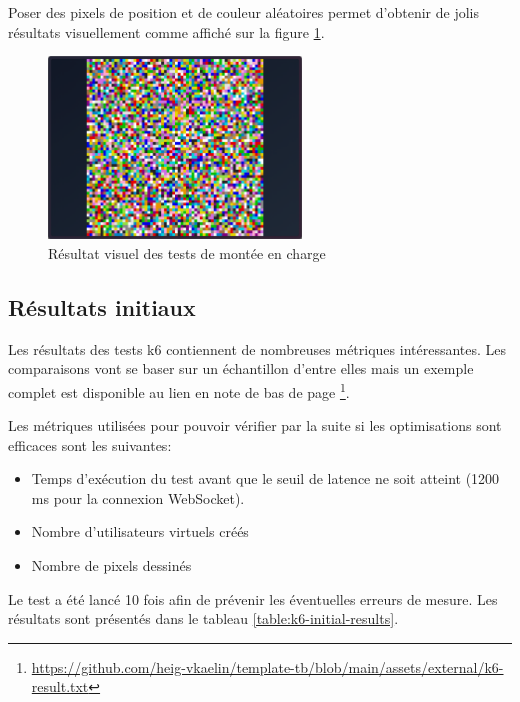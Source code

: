 Poser des pixels de position et de couleur aléatoires permet d'obtenir de jolis résultats visuellement comme affiché sur la figure \ref{fig:load-test-result}.

\begin{figure}[H]
  \centering
  \includegraphics[width=0.6\textwidth]{assets/figures/load-test-result.png}
  \caption{Résultat visuel des tests de montée en charge}
  \label{fig:load-test-result}
\end{figure}

\subsection{Résultats initiaux}

Les résultats des tests k6 contiennent de nombreuses métriques intéressantes. Les comparaisons vont se baser sur un échantillon d'entre elles mais un exemple complet est disponible au lien en note de bas de page \footnote{\url{https://github.com/heig-vkaelin/template-tb/blob/main/assets/external/k6-result.txt}}.

Les métriques utilisées pour pouvoir vérifier par la suite si les optimisations sont efficaces sont les suivantes:

\begin{itemize}
  \item Temps d'exécution du test avant que le seuil de latence ne soit atteint (1200 ms pour la connexion WebSocket).
  \item Nombre d'utilisateurs virtuels créés
  \item Nombre de pixels dessinés
\end{itemize}

Le test a été lancé 10 fois afin de prévenir les éventuelles erreurs de mesure. Les résultats sont présentés dans le tableau \ref{table:k6-initial-results}.

